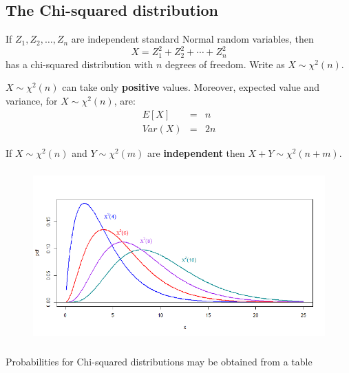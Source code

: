 \documentclass[notes=show,smaller,handout]{beamer}\usepackage[]{graphicx}\usepackage[]{color}
\begin{document}

%
%
%
%
%

\subsection{The Chi-squared distribution}

\begin{frame}{\subsecname}
  \begin{definition}
  If $Z_{1},Z_{2},\ldots ,Z_{n}$ are independent standard Normal random
  variables, then%
  \begin{equation*}
  X=Z_{1}^{2}+Z_{2}^{2}+\cdots +Z_{n}^{2}
  \end{equation*}%
  has a chi-squared distribution with $n$ degrees of freedom. Write as $X\sim \chi ^{2}(n)$.
  \end{definition}

  $X\sim \chi ^{2}(n)$ can take only \textbf{positive }values. Moreover, expected value and variance, for $X\sim \chi ^{2}(n)$, are:
  \begin{eqnarray*}
  E\left[ X\right] &=&n \\
  Var\left( X\right) &=&2n
  \end{eqnarray*}

  If $X\sim \chi ^{2}(n)$ and $Y\sim \chi ^{2}(m)$ are \textbf{%
  independent} then $X+Y\sim \chi ^{2}(n+m)$.
\end{frame}

\begin{frame}{\subsecname}

\begin{figure}[ptb]\centering
\includegraphics[height=2.6143in, width=4.6643in]{img/chisquared_pdfs__2.pdf}%
\end{figure}

Probabilities for Chi-squared distributions may be obtained from a table

\end{frame}%
\end{document}
